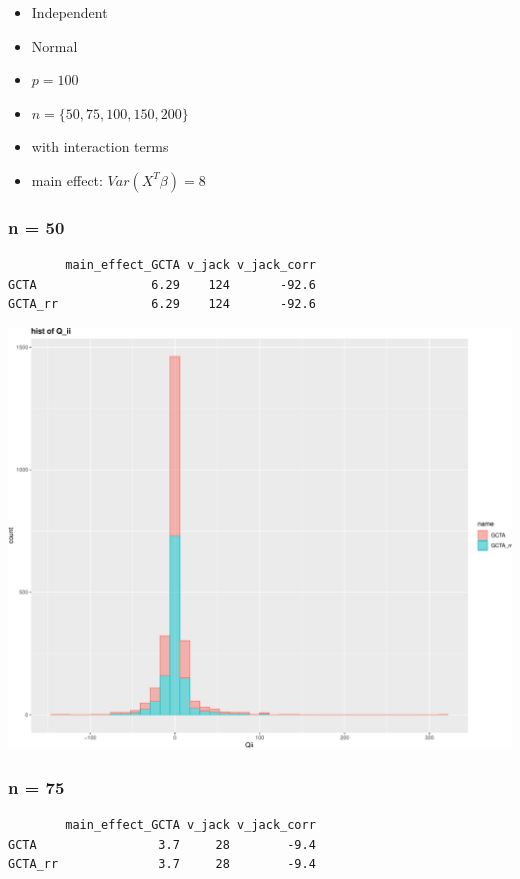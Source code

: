 \documentclass[]{article}
\providecommand{\tightlist}{%
  \setlength{\itemsep}{0pt}\setlength{\parskip}{0pt}}
\begin{document}
\begin{itemize}
\tightlist
\item
  Independent
\item
  Normal
\item
  \(p = 100\)
\item
  \(n = \{50, 75,100, 150, 200\}\)
\item
  with interaction terms
\item
  main effect: \(Var(X^T\beta) = 8\) \newpage
\end{itemize}

\subsubsection{n = 50}\label{n-50}

\begin{verbatim}
        main_effect_GCTA v_jack v_jack_corr
GCTA                6.29    124       -92.6
GCTA_rr             6.29    124       -92.6
\end{verbatim}

\includegraphics{GCTA_and_rr_v_jack_correction_files/figure-latex/unnamed-chunk-2-1.pdf}
\newpage

\subsubsection{n = 75}\label{n-75}

\begin{verbatim}
        main_effect_GCTA v_jack v_jack_corr
GCTA                 3.7     28        -9.4
GCTA_rr              3.7     28        -9.4
\end{verbatim}
\end{document}
